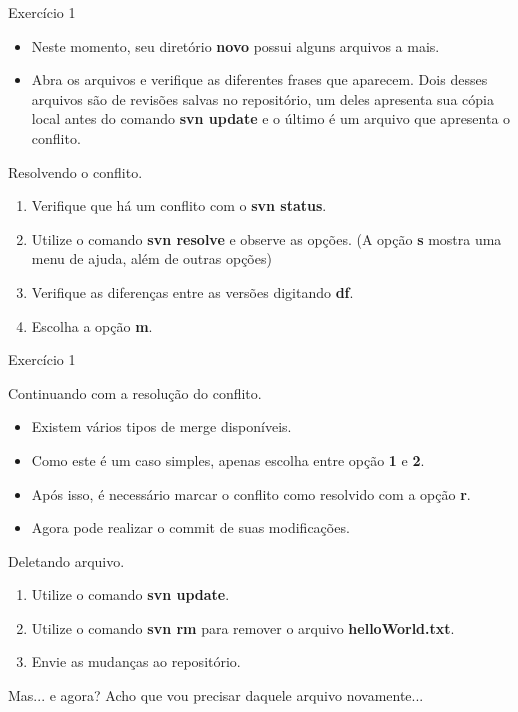 \documentclass[a4paper]{beamer}
\begin{document}
\begin{frame}{Exercício 1}

\begin{itemize}
\item Neste momento, seu diretório \textbf{novo} possui alguns arquivos a mais.
\item Abra os arquivos e verifique as diferentes frases que aparecem. Dois desses arquivos são de revisões salvas no repositório, um deles apresenta sua cópia local antes do comando \textbf{svn update} e o último é um arquivo que apresenta o conflito.
\end{itemize}

\pause
\vspace{10pt}
Resolvendo o conflito.
\begin{enumerate}
\item Verifique que há um conflito com o \textbf{svn status}.
\item Utilize o comando \textbf{svn resolve} e observe as opções. (A opção \textbf{s} mostra uma menu de ajuda, além de outras opções)
\item Verifique as diferenças entre as versões digitando \textbf{df}.
\item Escolha a opção \textbf{m}.
\end{enumerate}

\end{frame}

\begin{frame}{Exercício 1}

Continuando com a resolução do conflito.
\begin{itemize}
\item Existem vários tipos de merge disponíveis.
\item Como este é um caso simples, apenas escolha entre opção \textbf{1} e \textbf{2}.
\item Após isso, é necessário marcar o conflito como resolvido com a opção \textbf{r}.
\item Agora pode realizar o commit de suas modificações.
\end{itemize}

\pause
\vspace{10pt}
Deletando arquivo.
\begin{enumerate}
\item Utilize o comando \textbf{svn update}.
\item Utilize o comando \textbf{svn rm} para remover o arquivo \textbf{helloWorld.txt}.
\item Envie as mudanças ao repositório.
\end{enumerate}

\pause
Mas... e agora? Acho que vou precisar daquele arquivo novamente...

\end{frame}
\end{document}
